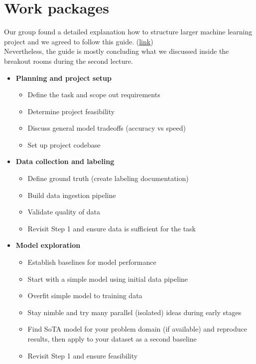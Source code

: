 \documentclass[lang=english,inputenc=utf8,fontsize=10pt]{ldvarticle}
\begin{document}
\section{Work packages}
\label{workp}
Our group found a detailed explanation how to structure larger machine learning project and we agreed to follow this guide. (\href{https://www.jeremyjordan.me/ml-projects-guide/}{link}) \\
Nevertheless, the guide is mostly concluding what we discussed inside the breakout rooms during the second lecture.\\
\begin{itemize}
    \item \textbf{Planning and project setup}
    \begin{itemize}
        \item Define the task and scope out requirements
        \item Determine project feasibility
        \item Discuss general model tradeoffs (accuracy vs speed)
        \item Set up project codebase
    \end{itemize}
    \item \textbf{Data collection and labeling}
    \begin{itemize}
        \item Define ground truth (create labeling documentation)
        \item Build data ingestion pipeline
        \item Validate quality of data
        \item Revisit Step 1 and ensure data is sufficient for the task
    \end{itemize}
    \item \textbf{Model exploration}
    \begin{itemize}
        \item Establish baselines for model performance
        \item Start with a simple model using initial data pipeline
        \item Overfit simple model to training data
        \item Stay nimble and try many parallel (isolated) ideas during early stages
        \item Find SoTA model for your problem domain (if available) and reproduce results, then apply to your dataset as a second baseline
        \item Revisit Step 1 and ensure feasibility

\end{itemize}
\end{itemize}
\end{document}
